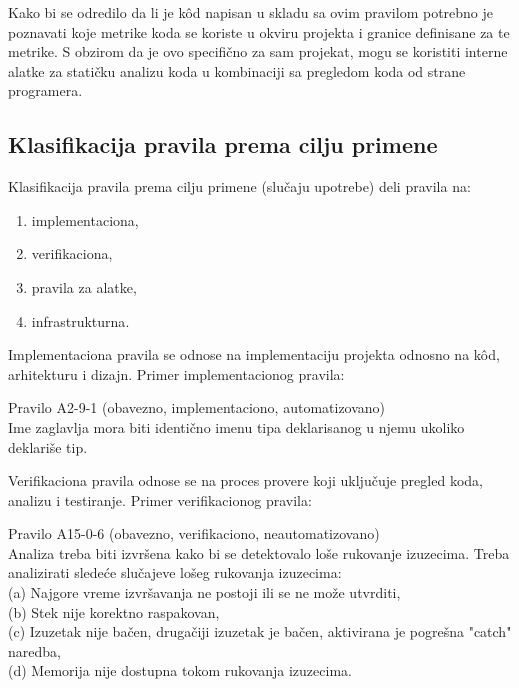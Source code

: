 \documentclass[12pt,oneside]{memoir}
\begin{document}

  Kako bi se odredilo da li je k\^{o}d napisan u skladu sa ovim pravilom potrebno je poznavati koje metrike koda se koriste u okviru projekta i
  granice definisane za te metrike. S obzirom da je ovo specifično za sam projekat, mogu se koristiti interne alatke za statičku analizu koda u kombinaciji
  sa pregledom koda od strane programera. 

\subsection{Klasifikacija pravila prema cilju primene}
Klasifikacija pravila prema cilju primene (slučaju upotrebe) deli pravila na:

\begin{enumerate}
  \item{implementaciona},
  \item{verifikaciona},
  \item{pravila za alatke},
  \item{infrastrukturna}.
\end{enumerate}

Implementaciona pravila se odnose na implementaciju projekta odnosno na k\^{o}d, arhitekturu i dizajn.
Primer implementacionog pravila:

\begin{center}
\begin{tcolorbox}
Pravilo A2-9-1 (obavezno, implementaciono, automatizovano) \\
Ime zaglavlja mora biti identično imenu tipa deklarisanog u njemu ukoliko deklariše tip.
\end{tcolorbox}
\end{center}


Verifikaciona pravila odnose se na proces provere koji uključuje pregled koda, analizu i testiranje.
Primer verifikacionog pravila:

\begin{center}
\begin{tcolorbox}
Pravilo A15-0-6 (obavezno, verifikaciono, neautomatizovano) \\
Analiza treba biti izvršena kako bi se detektovalo loše rukovanje izuzecima. Treba analizirati slede\'ce slučajeve lošeg rukovanja izuzecima: \\
(a) Najgore vreme izvršavanja ne postoji ili se ne može utvrditi, \\
(b) Stek nije korektno raspakovan, \\
(c) Izuzetak nije bačen, drugačiji izuzetak je bačen, aktivirana je pogre\v{s}na "catch" naredba, \\
(d) Memorija nije dostupna tokom rukovanja izuzecima.
\end{tcolorbox}
\end{center}
\end{document}
